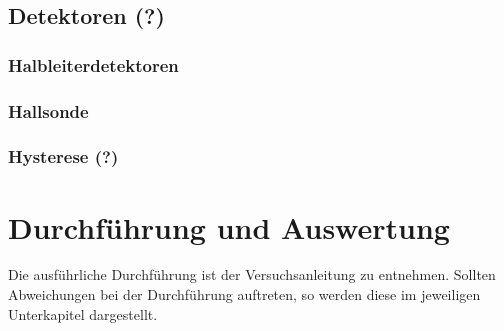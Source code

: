 \documentclass[11pt, a4paper]{article}
\numberwithin{equation}{section}
\begin{document}
\subsection{Detektoren (?)}
\subsubsection{Halbleiterdetektoren}

\subsubsection{Hallsonde}

\subsubsection{Hysterese (?)}


\section{Durchführung und Auswertung}
Die ausführliche Durchführung ist der Versuchsanleitung \cite{anleitung} zu entnehmen.
Sollten Abweichungen bei der Durchführung auftreten, so werden diese im jeweiligen Unterkapitel dargestellt.
\end{document}
